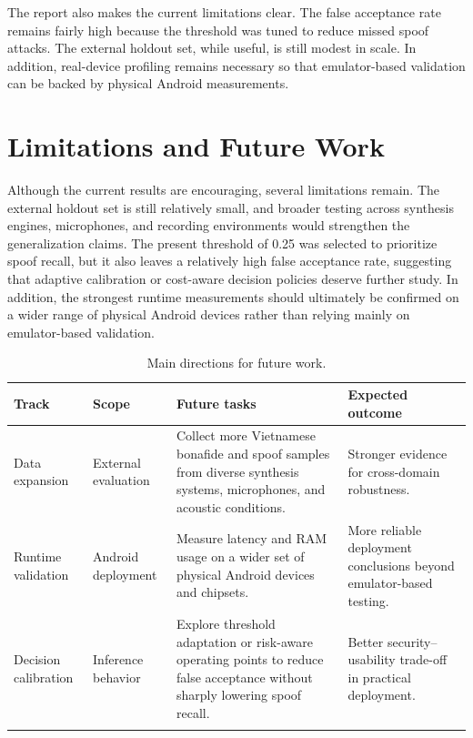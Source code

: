 \documentclass[pdflatex,sn-mathphys-num]{sn-jnl}
\begin{document}
The report also makes the current limitations clear. The false acceptance rate remains fairly high because the threshold was tuned to reduce missed spoof attacks. The external holdout set, while useful, is still modest in scale. In addition, real-device profiling remains necessary so that emulator-based validation can be backed by physical Android measurements.

\section{Limitations and Future Work}\label{sec:plan-requests}

Although the current results are encouraging, several limitations remain. The external holdout set is still relatively small, and broader testing across synthesis engines, microphones, and recording environments would strengthen the generalization claims. The present threshold of 0.25 was selected to prioritize spoof recall, but it also leaves a relatively high false acceptance rate, suggesting that adaptive calibration or cost-aware decision policies deserve further study. In addition, the strongest runtime measurements should ultimately be confirmed on a wider range of physical Android devices rather than relying mainly on emulator-based validation.

\begin{table}[htbp]
\caption{Main directions for future work.}
\label{tab:next-plan}
\centering
\small
\begin{tabular}{p{1.3cm}p{2.6cm}p{6.1cm}p{4.0cm}}
\toprule
\textbf{Track} & \textbf{Scope} & \textbf{Future tasks} & \textbf{Expected outcome} \\
\midrule
Data expansion & External evaluation & Collect more Vietnamese bonafide and spoof samples from diverse synthesis systems, microphones, and acoustic conditions. & Stronger evidence for cross-domain robustness. \\
Runtime validation & Android deployment & Measure latency and RAM usage on a wider set of physical Android devices and chipsets. & More reliable deployment conclusions beyond emulator-based testing. \\
Decision calibration & Inference behavior & Explore threshold adaptation or risk-aware operating points to reduce false acceptance without sharply lowering spoof recall. & Better security--usability trade-off in practical deployment. \\
\botrule
\end{tabular}
\end{table}
\end{document}
